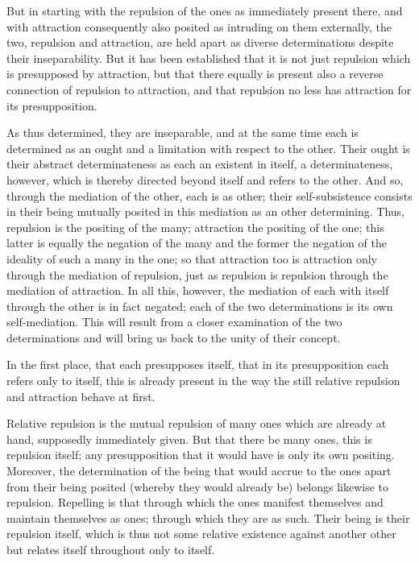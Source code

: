 But in starting with the repulsion
of the ones as immediately present there,
and with attraction consequently also posited
as intruding on them externally,
the two, repulsion and attraction,
are held apart as diverse
determinations despite their inseparability.
But it has been established that it is not
just repulsion which is presupposed by attraction,
but that there equally is present also
a reverse connection of repulsion to attraction,
and that repulsion no less has attraction for its presupposition.

As thus determined, they are inseparable,
and at the same time each
is determined as an ought and a limitation with respect to the other.
Their ought is their abstract determinateness
as each an existent in itself,
a determinateness, however, which is thereby
directed beyond itself and refers to the other.
And so, through the mediation of the other, each is as other;
their self-subsistence consists in their being mutually posited
in this mediation as an other determining.
Thus, repulsion is the positing of the many;
attraction the positing of the one;
this latter is equally the negation of the many
and the former the negation of the ideality
of such a many in the one;
so that attraction too is attraction only through
the mediation of repulsion,
just as repulsion is repulsion
through the mediation of attraction.
In all this, however, the mediation of each with itself
through the other is in fact negated;
each of the two determinations is its own self-mediation.
This will result from a closer examination of the two determinations
and will bring us back to the unity of their concept.

In the first place, that each presupposes itself,
that in its presupposition each refers only to itself,
this is already present in the way the still relative
repulsion and attraction behave at first.

Relative repulsion is the mutual repulsion
of many ones which are already at hand,
supposedly immediately given.
But that there be many ones, this is repulsion itself;
any presupposition that it would have is
only its own positing.
Moreover, the determination of the being
that would accrue to the ones
apart from their being posited
(whereby they would already be)
belongs likewise to repulsion.
Repelling is that through which
the ones manifest themselves
and maintain themselves as ones;
through which they are as such.
Their being is their repulsion itself,
which is thus not some relative
existence against another other
but relates itself throughout only to itself.

